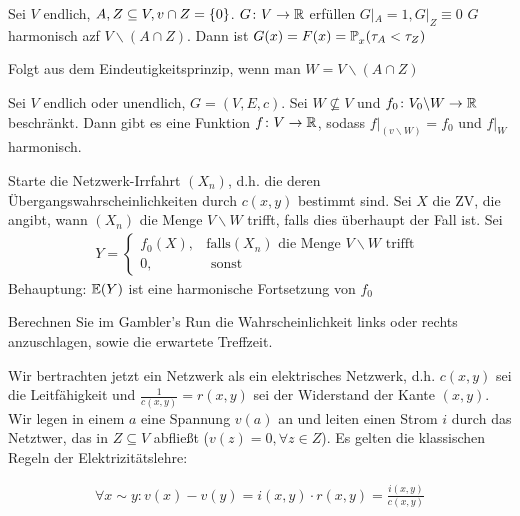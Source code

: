\begin{korollar}
	Sei $V$ endlich, $A,Z \subseteq V, v \cap Z = \{0\}$. $G \colon V \to \mathbb{R}$ erfüllen $G|_A = 1, G|_Z \equiv 0$ $G$ harmonisch azf $V \backslash (A \cap Z)$. Dann ist $G(x) = F(x) = \prop{\tau_A < \tau_Z}[][x]$
\end{korollar}
\begin{beweis}
	Folgt aus dem Eindeutigkeitsprinzip, wenn man $W = V\backslash (A \cap Z)$
\end{beweis}

\begin{satz}[Existenzprinzip]
	Sei $V$ endlich oder unendlich, $G = (V,E,c)$. Sei $W \nsubseteq V$ und $f_0 \colon V_0 \backslash W \to \mathbb{R}$ beschränkt. Dann gibt es eine Funktion $f \colon V \to \mathbb{R}$, sodass $f|_(v \backslash W) = f_0$ und $f|_W$ harmonisch.
\end{satz}

\begin{beweis}
	Starte die Netzwerk-Irrfahrt $(X_n)$, d.h. die deren  Übergangswahrscheinlichkeiten durch $c(x,y)$ bestimmt sind. Sei $X$ die ZV, die angibt, wann $(X_n)$ die Menge $V \backslash W$ trifft, falls dies überhaupt der Fall ist. Sei
	\begin{gather}
		Y = 
		\begin{cases}
			f_0(X), & \text{falls} (X_n) \text{ die Menge } V \backslash W \text{ trifft } \\
			0, & \text{ sonst}
		\end{cases}
	\end{gather}
	Behauptung: $\EW{Y}$ ist eine harmonische Fortsetzung von $f_0$
\end{beweis}
\begin{uebung}
	Berechnen Sie im Gambler's Run die Wahrscheinlichkeit links oder rechts anzuschlagen, sowie die erwartete Treffzeit.
\end{uebung}
Wir bertrachten jetzt ein Netzwerk als ein elektrisches Netzwerk, d.h. $c(x,y)$ sei die Leitfähigkeit und $\frac{1}{c(x,y)} = r(x,y)$ sei der Widerstand der Kante $(x,y)$. Wir legen in einem $a$ eine Spannung $v(a)$ an und leiten einen Strom $i$ durch das Netztwer, das in $Z \subseteq V$ abfließt ($v(z) = 0, \forall z \in Z$). Es gelten die klassischen Regeln der Elektrizitätslehre:

\begin{regel}
	\label{regel:ohm}
	\begin{align}
		\forall x\sim y: v(x)-v(y) = i(x,y) \cdot r(x,y) = \frac{i(x,y)}{c(x,y)}
	\end{align}
\end{regel}

